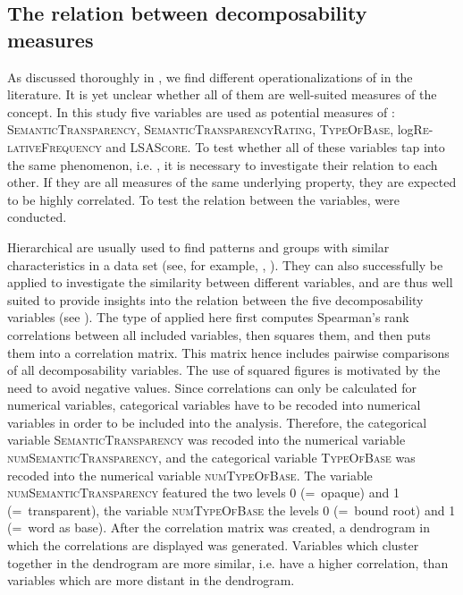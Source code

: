 \subsection{The relation between decomposability measures} \label{The Relation between Decomposability Measures} 
 


As discussed thoroughly in , we find different operationalizations of  in the literature. It is yet unclear whether all of them are well-suited measures of the concept. In this study five variables are used as potential measures of : \textsc{SemanticTransparency}, \textsc{SemanticTransparencyRating}, \textsc{TypeOfBase}, log\textsc{Re-lativeFrequency} and \textsc{LSAScore}.
To test whether all of these variables tap into the same phenomenon, i.e. , it is necessary to investigate their relation to each other. If they are all measures of the same underlying property, they are expected to be highly correlated. To test the relation between the variables,  were conducted. 

Hierarchical  are usually used to find patterns and groups with similar characteristics in a data  set (see, for example, \citealt[chapter 5.1.5]{Baayen.2008}, \citealt[chapter 8.1]{Zumel.2014}). They can also successfully be applied to investigate the similarity between different variables, and are thus well suited to provide insights into the relation between the five decomposability variables (see \citealt[200f.]{Baayen.2008}). 
The type of  applied here first computes Spearman's rank correlations between all included variables, then squares them, and then puts them into a correlation matrix. This matrix hence includes pairwise comparisons of all decomposability variables. The use of squared figures is motivated by the need to avoid negative values.
Since correlations can only be calculated for numerical variables,  categorical variables have to be recoded into numerical variables in order to be included into the analysis. 
Therefore, the categorical variable \textsc{SemanticTransparency}  was recoded into the numerical variable \textsc{numSemanticTransparency}, and the categorical variable \textsc{TypeOfBase} was recoded into the numerical variable \textsc{numTypeOfBase}.  The variable \textsc{numSemanticTransparency} featured  the two levels 0 (=~opaque) and 1 (=~transparent), the variable \textsc{numTypeOfBase} the levels 0 (=~bound root) and 1 (=~word as base). After the correlation matrix was created,  a dendrogram in which the correlations are displayed was generated. Variables which cluster together in the dendrogram are more similar, i.e. have a higher correlation, than variables which are more distant in the dendrogram. 

